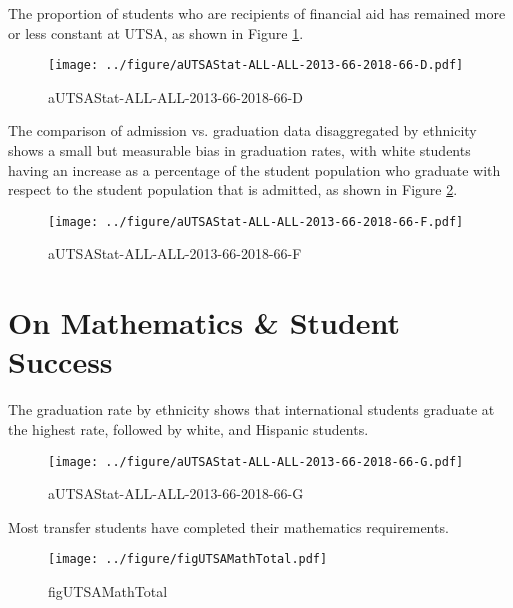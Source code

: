 \newpage
\vspace{\fill}
The proportion of students who are recipients of financial aid has remained more or less constant at UTSA, as shown in Figure \ref{fig:../figure/aUTSAStat-ALL-ALL-2013-66-2018-66-D}.
\begin{figure}[ht]
  \centering 
    \texttt{[image: ../figure/aUTSAStat-ALL-ALL-2013-66-2018-66-D.pdf]}
    \caption{aUTSAStat-ALL-ALL-2013-66-2018-66-D}
    \label{fig:../figure/aUTSAStat-ALL-ALL-2013-66-2018-66-D}
\end{figure}

\vspace{\fill}
The comparison of admission vs. graduation data disaggregated by ethnicity shows a small but measurable bias in graduation rates, with white students having an increase as a percentage of the student population who graduate with respect to the student population that is admitted, as shown in Figure \ref{fig:../figure/aUTSAStat-ALL-ALL-2013-66-2018-66-F}.
\begin{figure}[ht]
  \centering 
    \texttt{[image: ../figure/aUTSAStat-ALL-ALL-2013-66-2018-66-F.pdf]}
    \caption{aUTSAStat-ALL-ALL-2013-66-2018-66-F}
    \label{fig:../figure/aUTSAStat-ALL-ALL-2013-66-2018-66-F}
\end{figure}

\newpage
\section{On Mathematics \& Student Success}
\vspace{2in}
The graduation rate by ethnicity shows that international students graduate at the highest rate, followed by white, and Hispanic students. 
\begin{figure}[ht]
  \centering 
    \texttt{[image: ../figure/aUTSAStat-ALL-ALL-2013-66-2018-66-G.pdf]}
    \caption{aUTSAStat-ALL-ALL-2013-66-2018-66-G}
    \label{fig:../figure/aUTSAStat-ALL-ALL-2013-66-2018-66-G}
\end{figure}

\newpage
\vspace{\fill}
Most transfer students have completed their mathematics requirements.  
\begin{figure}[ht]
  \centering 
    \texttt{[image: ../figure/figUTSAMathTotal.pdf]}
    \caption{figUTSAMathTotal}
    \label{fig:../figure/figUTSAMathTotal}
\end{figure}

